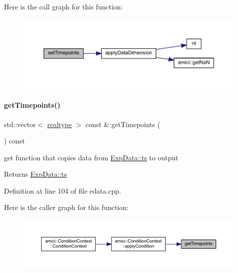 Here is the call graph for this function\+:
\nopagebreak
\begin{figure}[H]
\begin{center}
\leavevmode
\includegraphics[width=350pt]{classamici_1_1_exp_data_a058fb6c96339b5116b1af937bc77c2e4_cgraph}
\end{center}
\end{figure}
\mbox{\label{classamici_1_1_exp_data_a50ea5198d117f8f4ad1e34bb279975c8}} 
\paragraph{\texorpdfstring{getTimepoints()}{getTimepoints()}}
{\footnotesize\ttfamily std\+::vector$<$ \mbox{\hyperlink{namespaceamici_a1bdce28051d6a53868f7ccbf5f2c14a3}{realtype}} $>$ const  \& get\+Timepoints (\begin{DoxyParamCaption}{ }\end{DoxyParamCaption}) const}

get function that copies data from \mbox{\hyperlink{classamici_1_1_exp_data_aa7014a80e7b102f85a10e3b9a480e8e5}{Exp\+Data\+::ts}} to output

\begin{DoxyReturn}{Returns}
\mbox{\hyperlink{classamici_1_1_exp_data_aa7014a80e7b102f85a10e3b9a480e8e5}{Exp\+Data\+::ts}} 
\end{DoxyReturn}


Definition at line 104 of file edata.\+cpp.

Here is the caller graph for this function\+:
\nopagebreak
\begin{figure}[H]
\begin{center}
\leavevmode
\includegraphics[width=350pt]{classamici_1_1_exp_data_a50ea5198d117f8f4ad1e34bb279975c8_icgraph}
\end{center}
\end{figure}
\mbox{\label{classamici_1_1_exp_data_abee92d90cb7fe75fa39fb98c2ab0fd0a}} 
